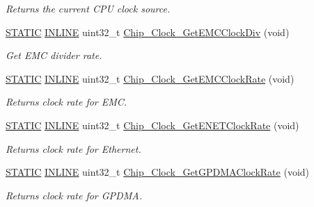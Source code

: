 \begin{DoxyCompactItemize}
\begin{DoxyCompactList}\small\item\em Returns the current C\+PU clock source. \end{DoxyCompactList}\item 
\hyperlink{group__LPC__Types__Public__Macros_ga10b2d890d871e1489bb02b7e70d9bdfb}{S\+T\+A\+T\+IC} \hyperlink{group__LPC__Types__Public__Types_ga2eb6f9e0395b47b8d5e3eeae4fe0c116}{I\+N\+L\+I\+NE} uint32\+\_\+t \hyperlink{group__CLOCK__17XX__40XX_ga83d188982840ca3fe4c37eaea4341d74}{Chip\+\_\+\+Clock\+\_\+\+Get\+E\+M\+C\+Clock\+Div} (void)
\begin{DoxyCompactList}\small\item\em Get E\+MC divider rate. \end{DoxyCompactList}\item 
\hyperlink{group__LPC__Types__Public__Macros_ga10b2d890d871e1489bb02b7e70d9bdfb}{S\+T\+A\+T\+IC} \hyperlink{group__LPC__Types__Public__Types_ga2eb6f9e0395b47b8d5e3eeae4fe0c116}{I\+N\+L\+I\+NE} uint32\+\_\+t \hyperlink{group__CLOCK__17XX__40XX_gae2649650e17f30a5fc753c11cfa3efb4}{Chip\+\_\+\+Clock\+\_\+\+Get\+E\+M\+C\+Clock\+Rate} (void)
\begin{DoxyCompactList}\small\item\em Returns clock rate for E\+MC. \end{DoxyCompactList}\item 
\hyperlink{group__LPC__Types__Public__Macros_ga10b2d890d871e1489bb02b7e70d9bdfb}{S\+T\+A\+T\+IC} \hyperlink{group__LPC__Types__Public__Types_ga2eb6f9e0395b47b8d5e3eeae4fe0c116}{I\+N\+L\+I\+NE} uint32\+\_\+t \hyperlink{group__CLOCK__17XX__40XX_ga04af0fa6fa72517538fc3d3918fcc0d9}{Chip\+\_\+\+Clock\+\_\+\+Get\+E\+N\+E\+T\+Clock\+Rate} (void)
\begin{DoxyCompactList}\small\item\em Returns clock rate for Ethernet. \end{DoxyCompactList}\item 
\hyperlink{group__LPC__Types__Public__Macros_ga10b2d890d871e1489bb02b7e70d9bdfb}{S\+T\+A\+T\+IC} \hyperlink{group__LPC__Types__Public__Types_ga2eb6f9e0395b47b8d5e3eeae4fe0c116}{I\+N\+L\+I\+NE} uint32\+\_\+t \hyperlink{group__CLOCK__17XX__40XX_ga3141accbf546f4de8cfb005e31ec53a8}{Chip\+\_\+\+Clock\+\_\+\+Get\+G\+P\+D\+M\+A\+Clock\+Rate} (void)
\begin{DoxyCompactList}\small\item\em Returns clock rate for G\+P\+D\+MA. \end{DoxyCompactList}\item 

\end{DoxyCompactItemize}
